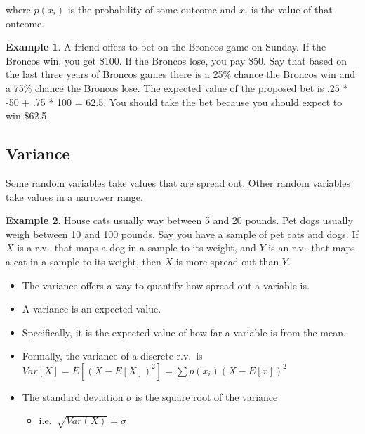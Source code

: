 \documentclass[]{article}
\theoremstyle{definition}
\newtheorem{exmp}{Example}[section]
\begin{document}
\noindent where $p(x_i)$ is the probability of some outcome and $x_i$ is the value of that outcome.

\begin{exmp}
A friend offers to bet on the Broncos game on Sunday. If the Broncos win, you get \$100. If the Broncos lose, you pay \$50. Say that based on the last three years of Broncos games there is a 25\% chance the Broncos win and a 75\% chance the Broncos lose. The expected value of the proposed bet is .25 * -50 + .75 * 100 = 62.5. You should take the bet because you should expect to win \$62.5.
\end{exmp} 

\subsection{Variance}
Some random variables take values that are spread out. Other random variables take values in a narrower range.

\begin{exmp}
House cats usually way between 5 and 20 pounds. Pet dogs usually weigh between 10 and 100 pounds. Say you have a sample of pet cats and dogs. If $X$ is a r.v.\ that maps a dog in a sample to its weight, and $Y$ is an r.v.\ that maps a cat in a sample to its weight, then $X$ is more spread out than $Y$.
\end{exmp} 

\begin{itemize}
\item The variance offers a way to quantify how spread out a variable is. 
\item A variance is an expected value. 
\item Specifically, it is the expected value of how far a variable is from the mean.
\item Formally, the variance of a discrete r.v.\ is $Var[X]=E[(X - E[X])^2] = \sum p(x_i) (X - E[x])^2$
\item The standard deviation $\sigma$ is the square root of the variance
	\begin{itemize}
	\item[] i.e.\ $\sqrt{Var(X)}=\sigma$
 	\end{itemize}
\end{itemize}
\end{document}
